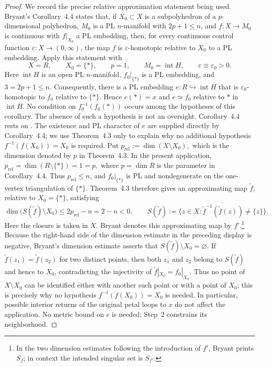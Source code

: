 \documentclass[12pt,oneside,a4paper]{article}
\theoremstyle{mytheorem}
\theoremstyle{remark}
\theoremstyle{definition}
\begin{document}
\begin{proof}
We record the precise relative approximation statement being used.
Bryant's Corollary~4.4
\cite[p.~235]{zbMATH01714503} states that, if $X_0\subset X$ is a
subpolyhedron of a $p$-dimensional polyhedron, $M_0$ is a PL
$n$-manifold with $2p+1\leq n$, and $f:X\to M_0$ is continuous with
$f|_{X_0}$ a PL embedding, then, for every continuous control function
$\varepsilon:X\to(0,\infty)$, the map $f$ is
$\varepsilon$-homotopic relative to $X_0$ to a PL embedding.
Apply
this statement with
\[
 X=R,\qquad X_0=\{*\},\qquad p=1,\qquad
 M_0=\operatorname{int}H,
 \qquad \varepsilon\equiv\varepsilon_0>0.
\]
Here $\operatorname{int}H$ is an open PL $n$-manifold,
$f_0|_{\{*\}}$ is a PL embedding, and $3=2p+1\leq n$.  Consequently,
there is a PL embedding
$e:R\hookrightarrow\operatorname{int}H$ that is
$\varepsilon_0$-homotopic to $f_0$ relative to $\{*\}$.  Hence
$e(*)=x$ and $e\simeq f_0$ relative to $*$ in
$\operatorname{int}H$.  No condition on
$f_0^{-1}(f_0(*))$ occurs among the hypotheses of this corollary.  The
absence of such a hypothesis is not an oversight.  Corollary~4.4 rests
on \cite[Theorem~4.3]{zbMATH01714503}.  The existence and PL character
of $e$ are supplied directly by Corollary~4.4; we use Theorem~4.3 only
to explain why no additional hypothesis
$f^{-1}(f(X_0))=X_0$ is required.  Put
$p_{\mathrm{rel}}:=\dim(X\setminus X_0),$
which is the dimension denoted by $p$ in Theorem~4.3.  In the present
application,
$p_{\mathrm{rel}}=\dim(R\setminus\{*\})=1=p,$
where $p=\dim R$ is the parameter in Corollary~4.4.  Thus
$p_{\mathrm{rel}}\leq n$, and $f_0|_{\{*\}}$ is PL and
nondegenerate on the one-vertex triangulation of $\{*\}$.  Theorem~4.3
therefore gives an approximating map $\widetilde f$, relative to
$X_0=\{*\}$, satisfying
\[
 \dim\bigl(S(\widetilde f)\setminus X_0\bigr)
 \leq2p_{\mathrm{rel}}-n=2-n<0,
 \qquad
 S(\widetilde f):=\overline{
 \{z\in X:\widetilde f^{-1}(\widetilde f(z))\neq\{z\}\}}.
\]
Here the closure is taken in $X$.
Bryant denotes this approximating map by $f'$.\footnote{In the two
dimension estimates following the introduction of $f'$, Bryant prints
$S_f$; in context the intended singular set is $S_{f'}$.}  Because the
right-hand side of the dimension estimate in the preceding display is negative,
Bryant's dimension estimate asserts that
$S(\widetilde f)\setminus X_0=\varnothing$.  If
$\widetilde f(z_1)=\widetilde f(z_2)$ for two distinct points, then both
$z_1$ and $z_2$ belong to $S(\widetilde f)$ and hence to $X_0$,
contradicting the injectivity of
$\widetilde f|_{X_0}=f_0|_{X_0}$.  Thus no point of $X\setminus X_0$
can be identified either with another such point or with a point of
$X_0$; this is precisely why no hypothesis
$f^{-1}(f(X_0))=X_0$ is needed.  In particular, possible interior
returns of the original petal loops to $x$ do not affect the
application.  No metric bound on $e$ is needed; Step~2 constrains its
neighborhood.


\end{proof}
\end{document}
